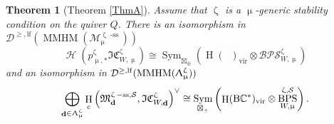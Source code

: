 \documentclass[a4paper,10pt]{amsart}
\renewcommand{\zeta}{\upzeta}
\renewcommand{\Lambda}{\Uplambda}
\renewcommand{\mu}{\upmu}
\newtheorem{theorem}{Theorem}[section]
\DeclareMathOperator{\BC}{B\mathbb{C}^*}
\newcommand{\SP}{\mathcal{S}}
\newcommand{\Mst}{\mathfrak{M}}
\newcommand{\Msp}{\mathcal{M}}
\newcommand{\ICSt}{\mathfrak{IC}}
\newcommand{\DTS}{\mathcal{BPS}}
\DeclareMathOperator{\sst}{-ss}
\DeclareMathOperator{\FreeComm}{Sym}
\DeclareMathOperator{\MMHM}{MMHM}
\DeclareMathOperator{\dd}{\mathbf{d}}
\DeclareMathOperator{\DT}{BPS}
\DeclareMathOperator{\vir}{vir}
\DeclareMathOperator{\Ho}{\mathcal{H}}
\DeclareMathOperator{\HO}{H}
\newcommand{\Dulf}{\mathcal{D}^{\geq, \mathrm{lf}}}
\begin{document}
\begin{theorem}[Theorem \ref{ThmA}]
\label{weakPBW}
Assume that $\zeta$ is a $\mu$-generic stability condition on the quiver $Q$.  There is an isomorphism in $\Dulf(\MMHM(\Msp^{\zeta\sst}_{\mu}))$ 
\begin{equation}
\label{weakeq}
\Ho(p^{\zeta}_{\mu,*}\ICSt_{W,\mu}^{\zeta})\cong\FreeComm_{\boxtimes_{\oplus}}\left(\HO(\BC )_{\vir}\otimes\DTS_{W,\mu}^{\zeta}\right)
\end{equation}
and an isomorphism in $\Dulf(\MMHM(\Lambda_{\mu}^{\zeta}))$
\begin{equation}
\label{vweakeq}
\bigoplus_{\dd\in\Lambda_{\mu}^{\zeta}}\HO_c\left(\Mst^{\zeta\sst,\SP}_{\dd},\ICSt_{W,\dd}^{\zeta}\right)^{\vee}\cong\FreeComm_{\boxtimes_{+}}\left(\HO(\BC )_{\vir}\otimes\DT^{\zeta,\SP}_{W,\mu}\right).
\end{equation}

\end{theorem}
\end{document}
